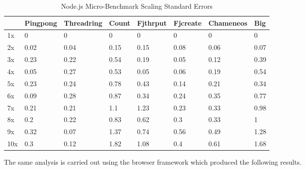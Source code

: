 \documentclass[oneside]{um-fict}
\begin{document}
\begin{table}[H]
    \begin{center}
        \begin{tabular}{|l|lllllll|}
        \hline
        & Pingpong & Threadring & Count & Fjthrput & Fjcreate & Chameneos & Big  \\ \hline
        1x  & 0        & 0          & 0     & 0        & 0        & 0    & 0    \\
        2x  & 0.02     & 0.04       & 0.15  & 0.15     & 0.08     & 0.06 & 0.07 \\
        3x  & 0.23     & 0.22       & 0.54  & 0.19     & 0.05     & 0.12 & 0.39 \\
        4x  & 0.05     & 0.27       & 0.53  & 0.05     & 0.06     & 0.19 & 0.54 \\
        5x  & 0.23     & 0.24       & 0.78  & 0.43     & 0.14     & 0.21 & 0.34 \\
        6x  & 0.09     & 0.28       & 0.87  & 0.34     & 0.24     & 0.35 & 0.77 \\
        7x  & 0.21     & 0.21       & 1.1   & 1.23     & 0.23     & 0.33 & 0.98 \\
        8x  & 0.2      & 0.22       & 0.83  & 0.62     & 0.3      & 0.33 & 1    \\
        9x  & 0.32     & 0.07       & 1.37  & 0.74     & 0.56     & 0.49 & 1.28 \\
        10x & 0.3      & 0.12       & 1.82  & 1.08     & 0.4      & 0.61 & 1.68 \\ \hline
        \end{tabular}
        \caption{Node.js Micro-Benchmark Scaling Standard Errors}\label{tab:nodeloadscalingsem}
    \end{center}
\end{table}

The same analysis is carried out using the browser framework which produced the following results.
\end{document}
